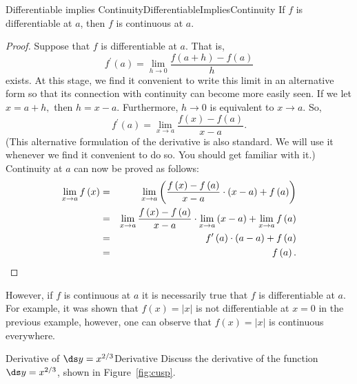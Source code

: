 \begin{theorem}{Differentiable implies Continuity}{DifferentiableImpliesContinuity}
If $f$ is differentiable at $a$, then $f$ is continuous at $a$.
\end{theorem}
\begin{proof}
Suppose that $f$ is differentiable at $a.$ That is,%
\begin{equation*}
	f^{\prime }\left( a\right) =\lim_{h\rightarrow 0}\frac{f\left( a+h\right)
		-f\left( a\right) }{h}
\end{equation*}%
exists. At this stage, we find it convenient to write this limit in an
alternative form so that its connection with continuity can become more
easily seen. If we let $x=a+h,$ then $h=x-a.$ Furthermore, $h\rightarrow 0$
is equivalent to $x\rightarrow a.$ So,%
\begin{equation*}
	f^{\prime }\left( a\right) =\lim_{x\rightarrow a}\frac{f\left( x\right)
		-f\left( a\right) }{x-a}.
\end{equation*}%
(This alternative formulation of the derivative is also standard. We will
use it whenever we find it convenient to do so. You should get familiar with
it.) Continuity at $a$ can now be proved as follows:%
\begin{eqnarray*}
	\lim_{x\rightarrow a}f\left( x\right) &=&\lim_{x\rightarrow a}\left( \frac{%
		f\left( x\right) -f\left( a\right) }{x-a}\cdot \left( x-a\right) +f\left(
	a\right) \right) \\
	&=&\lim_{x\rightarrow a}\frac{f\left( x\right) -f\left( a\right) }{x-a}\cdot
	\lim_{x\rightarrow a}\left( x-a\right) +\lim_{x\rightarrow a}f\left( a\right)
	\\
	&=&f^{\prime }\left( a\right) \cdot \left( a-a\right) +f\left( a\right) \\
	&=&f\left( a\right).
\end{eqnarray*}
\end{proof}

However, if $f$ is continuous at $a$ it is  necessarily
true that $f$ is differentiable at $a$.  For example, it was shown
that $f(x)=|x|$ is not differentiable at $x=0$ in the previous
example, however, one can observe that $f(x)=|x|$ is continuous
everywhere.

\begin{example}{Derivative of $\ds y=x^{2/3}$}{Derivative}
Discuss the derivative of the function $\ds y=x^{2/3}$, shown in
Figure~\ref{fig:cusp}. 
\end{example}

